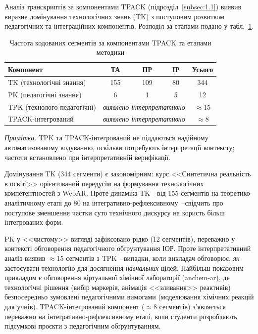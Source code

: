 Аналіз транскриптів за компонентами TPACK (підрозділ~\ref{subsec:1.1}) виявив виразне домінування технологічних знань (TK) з поступовим розвитком педагогічних та інтеграційних компонентів. Розподіл за етапами подано у табл.~\ref{tab:tpack_stages}.

\begin{table}[!h]
\centering
\caption{Частота кодованих сегментів за компонентами TPACK та етапами методики}
\label{tab:tpack_stages}
\small
\begin{tabular}{|l|c|c|c|c|}
\hline
\textbf{Компонент} & \textbf{ТА} & \textbf{ПР} & \textbf{ІР} & \textbf{Усього} \\
\hline
TK (технологічні знання) & 155 & 109 & 80 & 344 \\
\hline
PK (педагогічні знання) & 6 & 1 & 5 & 12 \\
\hline
TPK (технолого-педагогічні) & \multicolumn{3}{c|}{\textit{виявлено інтерпретативно}} & $\approx$15 \\
\hline
TPACK-інтегрований & \multicolumn{3}{c|}{\textit{виявлено інтерпретативно}} & $\approx$8 \\
\hline
\end{tabular}

\medskip
\footnotesize
\textit{Примітка.} TPK та TPACK-інтегрований не піддаються надійному автоматизованому кодуванню, оскільки потребують інтерпретації контексту; частоти встановлено при інтерпретативній верифікації.
\end{table}

Домінування TK (344 сегменти) є закономірним: курс <<Синтетична реальність в освіті>> орієнтований передусім на формування технологічних компетентностей з WebAR. Проте динаміка TK~--від 155 сегментів на теоретико-аналітичному етапі до 80 на інтегративно-рефлексивному~--свідчить про поступове зменшення частки суто технічного дискурсу на користь більш інтегрованих форм.

PK у <<чистому>> вигляді зафіксовано рідко (12 сегментів), переважно у контексті обговорення педагогічного обґрунтування ІОР. Проте інтерпретативний аналіз виявив $\approx$15 сегментів з TPK~--випадки, коли викладач обговорює, \textit{як} застосувати технологію для досягнення \textit{навчальних} цілей. Найбільш показовим прикладом є обговорення віртуальної хімічної лабораторії (anchem-ar), де технологічні рішення (вибір маркерів, анімація <<зливання>> реактивів) безпосередньо зумовлені педагогічними вимогами (моделювання хімічних реакцій для учнів). TPACK-інтегрований компонент ($\approx$8 сегментів) з'являється переважно на інтегративно-рефлексивному етапі, коли студенти розробляють підсумкові проєкти з педагогічним обґрунтуванням.

